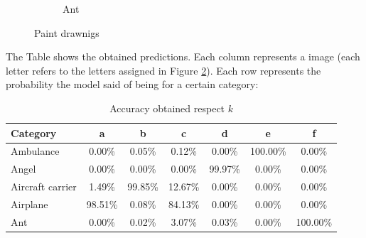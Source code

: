 \documentclass{article}
\begin{document}
\begin{figure}[H]
\begin{subfigure}{.25\textwidth}
        \caption{Ant}
        \label{fig:Ant}
    \end{subfigure}
    \caption{Paint drawnigs}
    \label{fig:PaintDrawings}
\end{figure}


The Table shows the obtained predictions. Each column represents a image (each letter refers to the letters assigned in Figure \ref{fig:PaintDrawings}). Each row represents the probability the model said of being for a certain category:

\begin{table}[ht]
    \centering
    \begin{tabular}{|l|cccccc|}
        \hline
        \textbf{Category} & \textbf{a} & \textbf{b} & \textbf{c} & \textbf{d} & \textbf{e} & \textbf{f} \\
        \hline
        Ambulance           & 0.00\% & 0.05\% & 0.12\% & 0.00\% & 100.00\% & 0.00\%   \\ \hline
        Angel               & 0.00\% & 0.00\% & 0.00\% & 99.97\% & 0.00\% & 0.00\% \\ \hline
        Aircraft carrier    & 1.49\% & 99.85\% & 12.67\% & 0.00\% & 0.00\% & 0.00\%  \\ \hline
        Airplane            & 98.51\% & 0.08\% & 84.13\% & 0.00\% & 0.00\% & 0.00\%  \\ \hline
        Ant                 & 0.00\% & 0.02\% & 3.07\% & 0.03\% & 0.00\% & 100.00\%  \\ \hline

    \end{tabular}
    \caption{Accuracy obtained respect $k$}
    \label{tab:knn_results}
\end{table}
\end{document}
